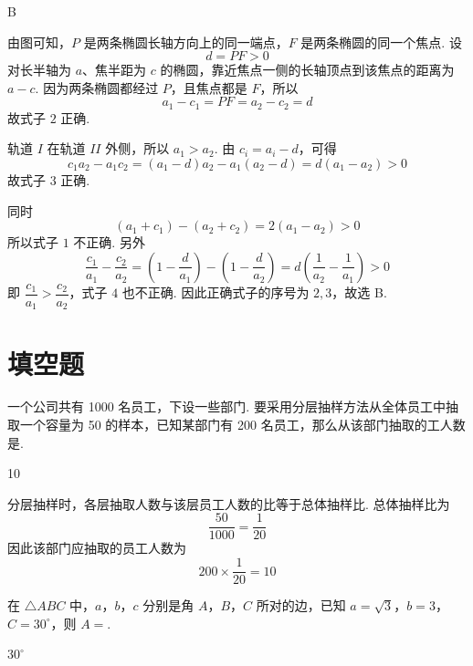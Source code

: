 \begin{answer}
B
\end{answer}

\begin{solution}
由图可知，\(P\) 是两条椭圆长轴方向上的同一端点，\(F\) 是两条椭圆的同一个焦点. 设
\[
d=PF>0
\]
对长半轴为 \(a\)、焦半距为 \(c\) 的椭圆，靠近焦点一侧的长轴顶点到该焦点的距离为 \(a-c\). 因为两条椭圆都经过 \(P\)，且焦点都是 \(F\)，所以
\[
a_{1}-c_{1}=PF=a_{2}-c_{2}=d
\]
故式子 \(2\) 正确.

轨道 \(I\) 在轨道 \(II\) 外侧，所以 \(a_{1}>a_{2}\). 由 \(c_i=a_i-d\)，可得
\[
c_{1}a_{2}-a_{1}c_{2}
=(a_{1}-d)a_{2}-a_{1}(a_{2}-d)
=d(a_{1}-a_{2})>0
\]
故式子 \(3\) 正确.

同时
\[
(a_{1}+c_{1})-(a_{2}+c_{2})
=2(a_{1}-a_{2})>0
\]
所以式子 \(1\) 不正确. 另外
\[
\frac{c_{1}}{a_{1}}-\frac{c_{2}}{a_{2}}
=\left(1-\frac{d}{a_{1}}\right)-\left(1-\frac{d}{a_{2}}\right)
=d\left(\frac{1}{a_{2}}-\frac{1}{a_{1}}\right)>0
\]
即 \(\dfrac{c_{1}}{a_{1}}>\dfrac{c_{2}}{a_{2}}\)，式子 \(4\) 也不正确. 因此正确式子的序号为 \(2,3\)，故选 B.
\end{solution}

\section{填空题}

\begin{problem}
一个公司共有 1000 名员工，下设一些部门. 要采用分层抽样方法从全体员工中抽取一个容量为 50 的样本，已知某部门有 200 名员工，那么从该部门抽取的工人数是\fillinblank{}.
\end{problem}

\begin{answer}
10
\end{answer}

\begin{solution}
分层抽样时，各层抽取人数与该层员工人数的比等于总体抽样比. 总体抽样比为
\[
\frac{50}{1000}=\frac{1}{20}
\]
因此该部门应抽取的员工人数为
\[
200\times\frac{1}{20}=10
\]
\end{solution}

\begin{problem}
在 \(\triangle ABC\) 中，\(a\)，\(b\)，\(c\) 分别是角 \(A\)，\(B\)，\(C\) 所对的边，已知 \(a = \sqrt{3}\)，\(b = 3\)，\(C = 30^{\circ}\)，则 \(A = \)\fillinblank{}.
\end{problem}

\begin{answer}
\(30^{\circ}\)
\end{answer}

